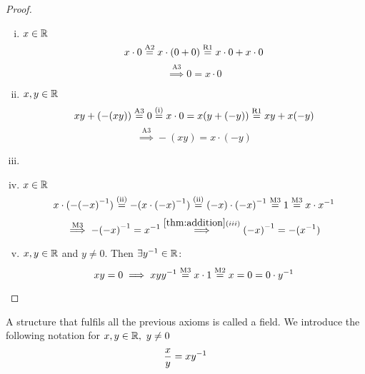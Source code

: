 \documentclass[../../script.tex]{subfiles}
\begin{document}
\begin{proof}\leavevmode
\begin{enumerate}[(i)]
	\item $x \in \mathbb{R}$
	\begin{equation}
		x \cdot 0 \stackrel{\text{A2}}{=} x \cdot (0 + 0)  \stackrel{\text{R1}}{=} x \cdot 0 + x \cdot 0
	\end{equation}
	\begin{equation}
		\stackrel{\text{A3}}{\implies} 0 = x \cdot 0
	\end{equation}
	
	\item $x,y \in \mathbb{R}$
	\begin{equation}
		xy + (-(xy)) \stackrel{\text{A3}}{=} 0 \stackrel{\text{(i)}}{=} x \cdot 0 = x(y + (-y)) \stackrel{\text{R1}}{=} xy + x(-y)
	\end{equation}
	\begin{equation}
		\stackrel{\text{A3}}{\implies} -(xy) = x\cdot(-y)
	\end{equation}
	
	\item \reader
	
	\item $x \in \mathbb{R}$
	\begin{equation}
		x \cdot (-{(-x)}^{-1}) \stackrel{\text{(ii)}}{=} -(x \cdot {(-x)}^{-1}) \stackrel{\text{(ii)}}{=} (-x) \cdot {(-x)}^{-1} \stackrel{\text{M3}}{=} 1 \stackrel{\text{M3}}{=} x \cdot {x}^{-1}
	\end{equation}
	\begin{equation}
		\stackrel{\text{M3}}{\implies} -{(-x)}^{-1} = {x}^{-1} \stackrel{\ref{thm:addition} (iii)}{\implies} {(-x)}^{-1} = -({x}^{-1})		
	\end{equation}
	
	\item $x, y \in \mathbb{R}$ and $y \ne 0$. Then $\exists {y}^{-1} \in \mathbb{R}$:
	\begin{equation}
		xy = 0 \implies xy{y}^{-1} \stackrel{\text{M3}}{=} x \cdot 1 \stackrel{\text{M2}}{=} x = 0 = 0 \cdot {y}^{-1}
	\end{equation}
\end{enumerate}
\end{proof}

\begin{rem}
A structure that fulfils all the previous axioms is called a  field. We introduce the following notation for $x, y \in \mathbb{R}, ~y \ne 0$
\[
	\frac{x}{y} = x{y}^{-1}
\]
\end{rem}
\end{document}
